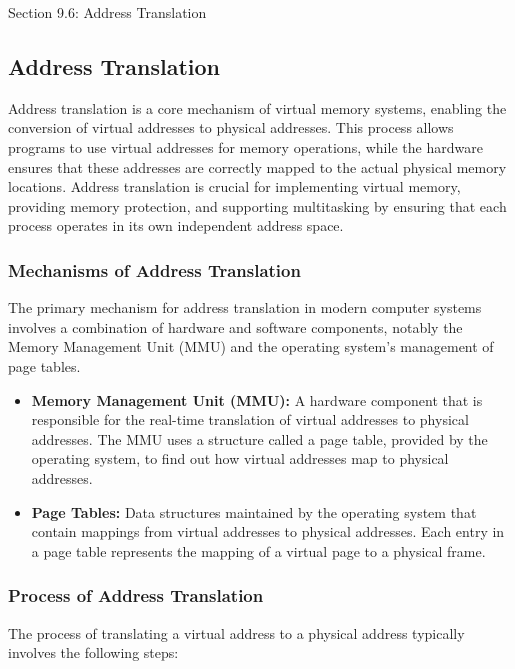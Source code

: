 \begin{notes}{Section 9.6: Address Translation}
    \subsection*{Address Translation}

    Address translation is a core mechanism of virtual memory systems, enabling the conversion of virtual addresses to physical addresses. This process allows programs to use virtual addresses for 
    memory operations, while the hardware ensures that these addresses are correctly mapped to the actual physical memory locations. Address translation is crucial for implementing virtual memory, 
    providing memory protection, and supporting multitasking by ensuring that each process operates in its own independent address space. \vspace*{1em}
    
    \subsubsection*{Mechanisms of Address Translation}
    
    The primary mechanism for address translation in modern computer systems involves a combination of hardware and software components, notably the Memory Management Unit (MMU) and the operating 
    system's management of page tables.
    
    \begin{itemize}
        \item \textbf{Memory Management Unit (MMU):} A hardware component that is responsible for the real-time translation of virtual addresses to physical addresses. The MMU uses a structure called 
        a page table, provided by the operating system, to find out how virtual addresses map to physical addresses.
        \item \textbf{Page Tables:} Data structures maintained by the operating system that contain mappings from virtual addresses to physical addresses. Each entry in a page table represents the 
        mapping of a virtual page to a physical frame.
    \end{itemize}
    
    \subsubsection*{Process of Address Translation}
    
    The process of translating a virtual address to a physical address typically involves the following steps:
    

\end{notes}
